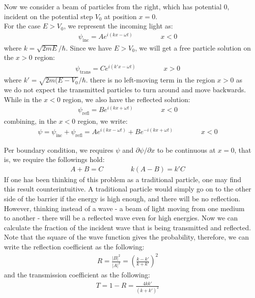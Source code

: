 \documentclass[11pt]{article}
\theoremstyle{break}
\theoremstyle{break}
\begin{document}
Now we consider a beam of particles from the right, which has potential $0$, incident on the potential step $V_0$ at position $x=0$. \\

For the case $E>V_0$, we represent the incoming light as:
\begin{align*}
\psi_{\text{inc}}  = Ae^{i(kx - \omega t)} \qquad\qquad x<0 \tag{$E>V_0$}
\end{align*}
where $k = \sqrt{2mE}/\hbar$. Since we have $E>V_0$, we will get a free particle solution on the $x>0$ region:
\begin{align*}
\psi_{\text{trans}} = Ce^{i(k'x -\omega t)} \qquad\qquad x>0 \tag{$E>V_0$}
\end{align*}
where $k' = \sqrt{2m(E-V_0}/\hbar$. there is no left-moving term in the region $x>0$ as we do not expect the transmitted particles to turn around and move backwards. While in the $x<0$ region, we also have the reflected solution:
\begin{align*}
\psi_{\text{refl}} = Be^{i(kx + \omega t)} \qquad\qquad x<0 \tag{$E>V_0$}
\end{align*}
combining, in the $x<0$ region, we write:
\begin{align*}
\psi = \psi_{\text{inc}} + \psi_{\text{refl}} =  Ae^{i(kx - \omega t)} + Be^{-i (kx + \omega t)}  \qquad \qquad x<0 \tag{$E>V_0$}
\end{align*}

Per boundary condition, we requires $\psi$ and $\partial\psi/\partial x$ to be continuous at $x=0$, that is, we require the followings hold:
\begin{align*}
A + B = C \qquad\qquad k(A-B) = k'C \tag{$E>V_0$}
\end{align*}
If one has been thinking of this problem as a traditional particle, one may find this result counterintuitive. A traditional particle would simply go on to the other side of the barrier if the energy is high enough, and there will be no reflection. However, thinking instead of a wave - a beam of light moving from one medium to another - there will be a reflected wave even for high energies. Now we can calculate the fraction of the incident wave that is being transmitted and reflected. Note that the square of the wave function gives the probability, therefore, we can write the reflection coefficient as the following:
\begin{align*}
R = \frac{|B|^2}{|A|^2} = \left(\frac{k-k'}{k+k'} \right)^2  \tag{$E>V_0$}
\end{align*}
and the transmission coefficient as the following:
\begin{align*}
T = 1-R = \frac{4kk'}{(k+k')^2}\tag{$E>V_0$}
\end{align*}\\
\end{document}
